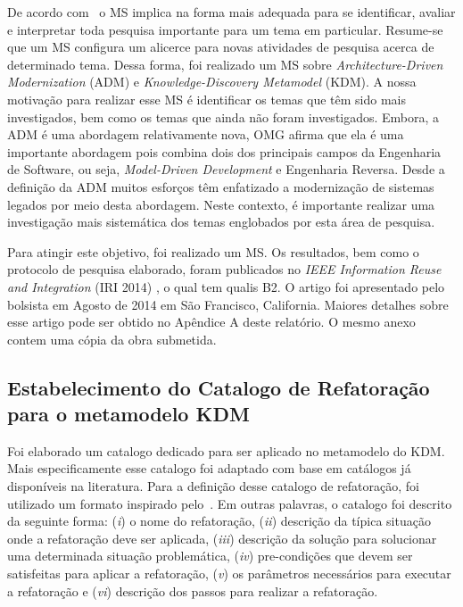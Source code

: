 De acordo com~\citet{kit04} o MS implica na forma mais adequada para se identificar, avaliar e interpretar toda pesquisa importante para um tema em particular. Resume-se que um MS configura um alicerce para novas atividades de pesquisa acerca de determinado tema. Dessa forma, foi realizado um MS sobre \textit{Architecture-Driven Modernization} (ADM) e \textit{Knowledge-Discovery Metamodel} (KDM). A nossa motivação para realizar esse MS é identificar os temas que têm sido mais investigados, bem como os temas que ainda não foram investigados. Embora, a ADM é uma abordagem relativamente nova, OMG afirma que ela é uma importante abordagem pois combina dois dos principais campos da Engenharia de Software, ou seja, \textit{Model-Driven Development} e Engenharia Reversa. Desde a definição da ADM muitos esforços têm enfatizado a modernização de sistemas legados por meio desta abordagem. Neste contexto, é importante realizar uma investigação mais sistemática dos temas englobados por esta área de pesquisa. 

Para atingir este objetivo, foi realizado um MS. Os resultados, bem como o protocolo de pesquisa elaborado, foram publicados no \textit{IEEE Information Reuse and Integration} (IRI 2014) , o qual tem qualis B2. O artigo foi apresentado pelo bolsista em Agosto de 2014 em São Francisco, California. Maiores detalhes sobre esse artigo pode ser obtido no Apêndice A deste relatório. O mesmo anexo contem uma cópia da obra submetida.


\subsection{Estabelecimento do Catalogo de Refatoração para o metamodelo KDM} %
	 \label{sub:catalogo_kdm}

Foi elaborado um catalogo dedicado para ser aplicado no metamodelo do KDM. Mais especificamente esse catalogo foi adaptado com base em catálogos já disponíveis na literatura. Para a definição desse catalogo de refatoração, foi utilizado um formato inspirado pelo~\cite{refactImpro}. Em outras palavras, o catalogo foi descrito da seguinte forma: (\textit{i}) o nome do refatoração, (\textit{ii}) descrição da típica situação onde a refatoração deve ser aplicada, (\textit{iii}) descrição da solução para solucionar uma determinada situação problemática, (\textit{iv}) pre-condições que devem ser satisfeitas para aplicar a refatoração, (\textit{v}) os parâmetros necessários para executar a refatoração e (\textit{vi}) descrição dos passos para realizar a refatoração.

